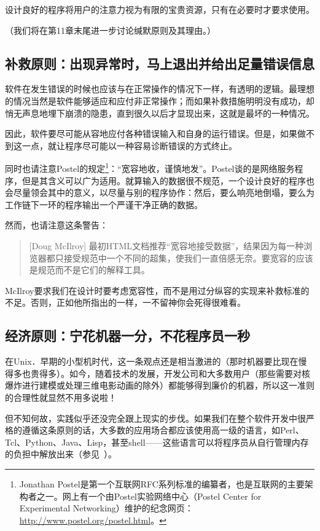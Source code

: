 \documentclass[12pt,oneside]{ctexbook}
\begin{document}
\begin{common-format}
设计良好的程序将用户的注意力视为有限的宝贵资源，只有在必要时才要求使用。

（我们将在第11章末尾进一步讨论缄默原则及其理由。）


\subsection{补救原则：出现异常时，马上退出并给出足量错误信息}
软件在发生错误的时候也应该与在正常操作的情况下一样，有透明的逻辑。最理想的情况当然是软件能够适应和应付非正常操作；而如果补救措施明明没有成功，却悄无声息地埋下崩溃的隐患，直到很久以后才显现出来，这就是最坏的一种情况。

因此，软件要尽可能从容地应付各种错误输入和自身的运行错误。但是，如果做不到这一点，就让程序尽可能以一种容易诊断错误的方式终止。

同时也请注意Postel的规定\footnote{Jonathan Postel是第一个互联网RFC系列标准的编纂者，也是互联网的主要架构者之一。网上有一个由Postel实验网络中心（Postel Center for Experimental Networking）维护的纪念网页：\href{http://www.postel.org/postel.html}{http://www.postel.org/postel.html}。}：“宽容地收，谨慎地发”。Postel谈的是网络服务程序，但是其含义可以广为适用。就算输入的数据很不规范，一个设计良好的程序也会尽量领会其中的意义，以尽量与别的程序协作：然后，要么响亮地倒塌，要么为工作链下一环的程序输出一个严谨干净正确的数据。

然而，也请注意这条警告：

\begin{quote}[Doug McIlroy]
最初HTML文档推荐“宽容地接受数据”，结果因为每一种浏览器都只接受规范中一个不同的超集，使我们一直倍感无奈。要宽容的应该是规范而不是它们的解释工具。
\end{quote}

McIlroy要求我们在设计时要考虑宽容性，而不是用过分纵容的实现来补救标准的不足。否则，正如他所指出的一样，一不留神你会死得很难看。

\subsection{经济原则：宁花机器一分，不花程序员一秒}
在Unix．早期的小型机时代，这一条观点还是相当激进的（那时机器要比现在慢得多也贵得多）。如今，随着技术的发展，开发公司和大多数用户（那些需要对核爆炸进行建模或处理三维电影动画的除外）都能够得到廉价的机器，所以这一准则的合理性就显然不用多说啦！

但不知何故，实践似乎还没完全跟上现实的步伐。如果我们在整个软件开发中很严格的遵循这条原则的话，大多数的应用场合都应该使用高一级的语言，如Perl、Tcl、Python、Java、Lisp，甚至shell——这些语言可以将程序员从自行管理内存的负担中解放出来（参见~\cite{Ravenbrook}）。


\end{common-format}
\end{document}

